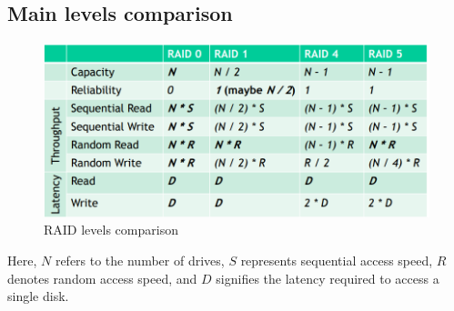 \subsection{Main levels comparison}
\begin{figure}[H]
    \centering
    \includegraphics[width=0.6\linewidth]{images/levcomp.png}
    \caption{RAID levels comparison}
\end{figure}
Here, $N$ refers to the number of drives, $S$ represents sequential access speed, $R$ denotes random access speed, and $D$ signifies the latency required to access a single disk.